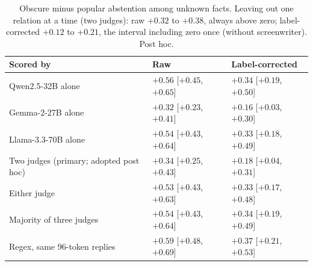 \begin{table}[h]
\centering\footnotesize\setlength{\tabcolsep}{3pt}
\begin{tabular}{lll}
\toprule
Scored by & Raw & Label-corrected \\
\midrule
Qwen2.5-32B alone & $+0.56$ [$+0.45$, $+0.65$] & $+0.34$ [$+0.19$, $+0.50$] \\
Gemma-2-27B alone & $+0.32$ [$+0.23$, $+0.41$] & $+0.16$ [$+0.03$, $+0.30$] \\
Llama-3.3-70B alone & $+0.54$ [$+0.43$, $+0.64$] & $+0.33$ [$+0.18$, $+0.49$] \\
Two judges (primary; adopted post hoc) & $+0.34$ [$+0.25$, $+0.43$] & $+0.18$ [$+0.04$, $+0.31$] \\
Either judge & $+0.53$ [$+0.43$, $+0.63$] & $+0.33$ [$+0.17$, $+0.48$] \\
Majority of three judges & $+0.54$ [$+0.43$, $+0.64$] & $+0.34$ [$+0.19$, $+0.49$] \\
Regex, same 96-token replies & $+0.59$ [$+0.48$, $+0.69$] & $+0.37$ [$+0.21$, $+0.53$] \\
\bottomrule
\end{tabular}
\caption{Obscure minus popular abstention among unknown facts. Leaving out one relation at a time (two judges): raw $+0.32$ to $+0.38$, always above zero; label-corrected $+0.12$ to $+0.21$, the interval including zero once (without screenwriter). Post hoc.}
\label{tab:x0gap}
\end{table}

